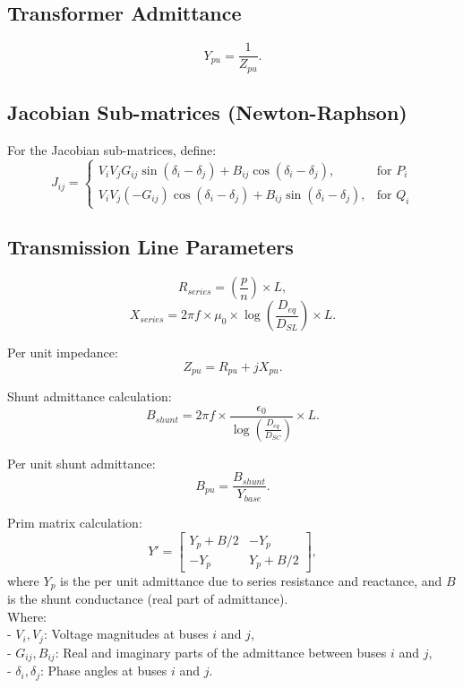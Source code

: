 \documentclass{article}
\begin{document}
	\subsection*{Transformer Admittance}
	\[ Y_{pu} = \frac{1}{Z_{pu}}. \]
	
	\subsection*{Jacobian Sub-matrices (Newton-Raphson)}
	For the Jacobian sub-matrices, define:
	\[ J_{ij} =
	\begin{cases}
		V_i V_j G_{ij} \sin(\delta_i - \delta_j) + B_{ij} \cos(\delta_i - \delta_j), & \text{for } P_i \\
		V_i V_j (-G_{ij}) \cos(\delta_i - \delta_j) + B_{ij} \sin(\delta_i - \delta_j), & \text{for } Q_i
	\end{cases}
	\]
	
	\subsection*{Transmission Line Parameters}
	\[ R_{series} = \left( \frac{p}{n} \right) \times L, \]
	\[ X_{series} = 2 \pi f \times \mu_0 \times \log\left(\frac{D_{eq}}{D_{SL}}\right) \times L. \]
	
	Per unit impedance:
	\[ Z_{pu} = R_{pu} + jX_{pu}. \]
	
	Shunt admittance calculation:
	\[ B_{shunt} = 2 \pi f \times \frac{\epsilon_0}{\log\left(\frac{D_{eq}}{D_{SC}}\right)} \times L. \]
	
	Per unit shunt admittance:
	\[ B_{pu} = \frac{B_{shunt}}{Y_{base}}. \]
	
	Prim matrix calculation:
	\[ Y' =
	\begin{bmatrix}
		Y_p + B/2 & -Y_p \\
		-Y_p & Y_p + B/2
	\end{bmatrix},
	\]
	where \(Y_p\) is the per unit admittance due to series resistance and reactance, and \(B\) is the shunt conductance (real part of admittance). \\

	\noindent
	Where: \\
	- \(V_i, V_j\): Voltage magnitudes at buses \(i\) and \(j\), \\
	- \(G_{ij}, B_{ij}\): Real and imaginary parts of the admittance between buses \(i\) and \(j\), \\
	- \(\delta_i, \delta_j\): Phase angles at buses \(i\) and \(j\).
	
\end{document}
